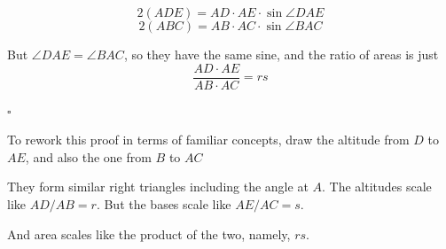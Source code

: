 \documentclass[11pt, oneside]{article}
\begin{document}
\[ 2 (ADE) = AD \cdot AE \cdot \sin \angle DAE \]
\[ 2 (ABC) = AB \cdot AC \cdot \sin \angle BAC \]

But $\angle DAE = \angle BAC$, so they have the same sine, and the ratio of areas is just
\[ \frac{AD \cdot AE}{AB \cdot AC} = rs \]

$\square$

To rework this proof in terms of familiar concepts, draw the altitude from $D$ to $AE$, and also the one from $B$ to $AC$

They form similar right triangles including the angle at $A$.  The altitudes scale like $AD/AB = r$.  But the bases scale like $AE/AC = s$.  

And area scales like the product of the two, namely, $rs$.
\end{document}
